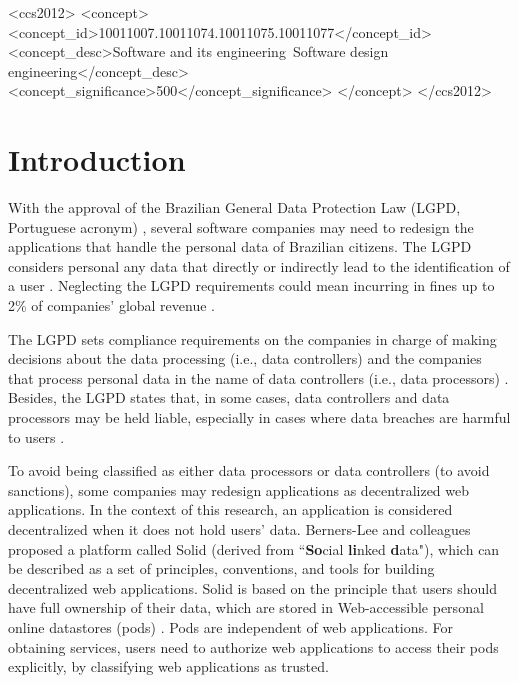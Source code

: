 \documentclass[sigconf]{acmart}
\begin{document}
\begin{CCSXML}
<ccs2012>
<concept>
<concept_id>10011007.10011074.10011075.10011077</concept_id>
<concept_desc>Software and its engineering~Software design engineering</concept_desc>
<concept_significance>500</concept_significance>
</concept>
</ccs2012>
\end{CCSXML}



%

%
\maketitle

\section{Introduction}

With the approval of the Brazilian General Data Protection Law (LGPD, Portuguese acronym) \cite{LGPD18}, several software companies may need to redesign the applications that handle the personal data of Brazilian citizens. The LGPD considers personal any data that directly or indirectly lead to the identification of a user \cite{LGPD18}. Neglecting the LGPD requirements could mean incurring in fines up to 2\% of companies' global revenue \cite{LGPD18}.

The LGPD sets compliance requirements on the companies in charge of making decisions about the data processing (i.e., data controllers) and the companies that process personal data in the name of data controllers (i.e., data processors) \cite{LGPD18}. Besides, the LGPD states that, in some cases, data controllers and data processors may be held liable, especially in cases where data breaches are harmful to users \cite{LGPD18}.

To avoid being classified as either data processors or data controllers (to avoid sanctions), some companies may redesign applications as decentralized web applications. In the context of this research, an application is considered decentralized when it does not hold users' data. Berners-Lee and colleagues \cite{Sambra} proposed a platform called Solid (derived from ``\textbf{So}cial \textbf{li}nked \textbf{d}ata"), which can be described as a set of principles, conventions, and tools for building decentralized web applications. Solid is based on the principle that users should have full ownership of their data, which are stored in Web-accessible personal online datastores (pods) \cite{Sambra}. Pods are independent of web applications. For obtaining services, users need to authorize web applications to access their pods explicitly, by classifying web applications as trusted.
\end{document}
